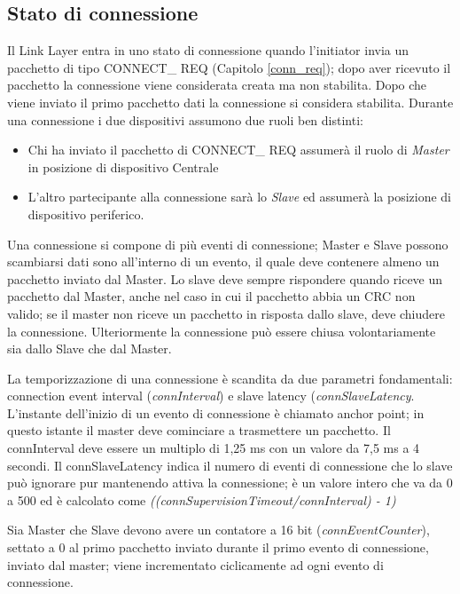 \subsection{Stato di connessione}\label{connState}
Il Link Layer entra in uno stato di connessione quando l'initiator invia un pacchetto di tipo CONNECT\_ REQ (Capitolo \ref{conn_req}); dopo aver ricevuto il pacchetto la connessione viene considerata creata ma non stabilita. Dopo che viene inviato il primo pacchetto dati la connessione si considera stabilita.
Durante una connessione i due dispositivi assumono due ruoli ben distinti:
\begin{itemize}
\item Chi ha inviato il pacchetto di CONNECT\_ REQ assumerà il ruolo di \emph{Master} in posizione di dispositivo Centrale
\item L'altro partecipante alla connessione sarà lo \emph{Slave} ed assumerà la posizione di dispositivo periferico.
\end{itemize}
Una connessione si compone di più eventi di connessione; Master e Slave possono scambiarsi dati sono all'interno di un evento, il quale deve contenere almeno un pacchetto inviato dal Master. Lo slave deve sempre rispondere quando riceve un pacchetto dal Master, anche nel caso in cui il pacchetto abbia un CRC non valido; se il master non riceve un pacchetto in risposta dallo slave, deve chiudere la connessione. Ulteriormente la connessione può essere chiusa volontariamente sia dallo Slave che dal Master.


La temporizzazione di una connessione è scandita da due parametri fondamentali: connection event interval (\emph{connInterval}) e slave latency (\emph{connSlaveLatency}. L'instante dell'inizio di un evento di connessione è chiamato anchor point; in questo istante il master deve cominciare a trasmettere un pacchetto.
Il connInterval deve essere un multiplo di 1,25 ms con un valore da 7,5 ms a 4 secondi.
Il connSlaveLatency indica il numero di eventi di connessione che lo slave può ignorare pur mantenendo attiva la connessione; è un valore intero che va da 0 a 500 ed è calcolato come \emph{((connSupervisionTimeout/connInterval) - 1)}


Sia Master che Slave devono avere un contatore a 16 bit (\emph{connEventCounter}), settato a 0 al primo pacchetto inviato durante il primo evento di connessione, inviato dal master; viene incrementato ciclicamente ad ogni evento di connessione.

